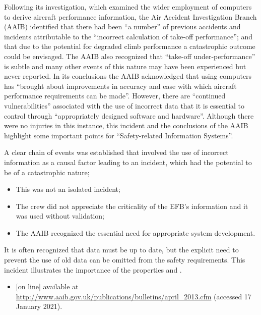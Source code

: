 Following its investigation, which examined the wider employment of computers to derive aircraft performance information, the Air Accident Investigation Branch (AAIB) identified that there had been ``a number'' of previous accidents and incidents attributable to the ``incorrect calculation of take-off performance''; and that due to the potential for degraded climb performance a catastrophic outcome could be envisaged. The AAIB also recognized that ``take-off under-performance'' is subtle and many other events of this nature may have been experienced but never reported. In its conclusions the AAIB acknowledged that using computers has ``brought about improvements in \gls{accuracy} and ease with which aircraft performance requirements can be made''. However, there are ``continued vulnerabilities'' associated with the use of incorrect data that it is essential to control through ``appropriately designed software and hardware''. Although there were no injuries in this instance, this incident and the conclusions of the AAIB highlight some important points for ``Safety-related Information Systems''.

A clear chain of events was established that involved the use of incorrect information as a causal factor leading to an incident, which had the potential to be of a catastrophic nature;
\begin{itemize}
\item This was not an isolated incident;
\item The crew did not appreciate the criticality of the EFB’s information and it was used without validation; 
\item The AAIB recognized the essential need for appropriate system development. 
\end{itemize}

It is often recognized that data must be up to date, but the explicit need to prevent the use of old data can be omitted from the safety requirements. This incident illustrates the importance of the properties  and . 

    
\begin{itemize}
\item \raggedright{ [on line] available at \href{http://www.aaib.gov.uk/publications/bulletins/april_2013.cfm}{http://www.aaib.gov.uk/publications/bulletins/april\_2013.cfm} (accessed 17 January 2021).}
\end{itemize}
    

